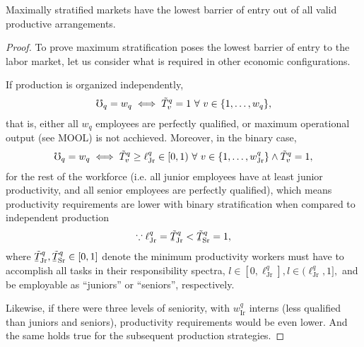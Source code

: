 \documentclass[hidelinks, nonatbib]{elsarticle}
\begin{document}
\begin{lemma}
    \label{mpl}
    Maximally stratified markets have the lowest barrier of entry out of all valid productive arrangements.
    
    \begin{proof}
        To prove maximum stratification poses the lowest barrier of entry to the labor market, let us consider what is required in other economic configurations.
        
        If production is organized independently,
        \begin{gather}
        \mho_q = w_q
        \iff
        \tilde{T}_{v}^{q}
        =
        1
        \
        \forall
        \
        v \in \{1, \dots, w_q\}
        ,
        \end{gather}
        that is, either all $w_q$ employees are perfectly qualified, or maximum operational output (see MOOL) is not acchieved. Moreover, in the binary case,
        \begin{gather}
        \mho_q = w_q
        \iff
        \tilde{T}_{v}^{q}
        \geq
        \ell_{\text{Jr}}^{q}
        \in
        [0,1)
        \
        \forall
        \
        v \in \{1, \dots, w_{\text{Jr}}^{q}\}
        \land
        \tilde{T}_{v}^{q}
        =
        1
        ,
        \end{gather}
        for the rest of the workforce (i.e. all junior employees have at least junior productivity, and all senior employees are perfectly qualified), which means productivity requirements are lower with binary stratification when compared to independent production
        \begin{gather}
            \because
            \ell_{\text{Jr}}^{q}
            =
            \underaccent{\bar}{\tilde{T}}_{\text{Jr}}^{q}
            <
            \underaccent{\bar}{\tilde{T}}_{\text{Sr}}^{q}
            = 1
            ,
        \end{gather}
        where $\underaccent{\bar}{\tilde{T}}_{\text{Jr}}^{q}, \underaccent{\bar}{\tilde{T}}_{\text{Sr}}^{q} \in [0,1]$ denote the minimum productivity workers must have to accomplish all tasks in their responsibility spectra,
        $
            l \in [0, \ell_{\text{Jr}}^{q}]
            ,
            l \in (\ell_{\text{Jr}}^{q}, 1]
            ,
        $
        and be employable as ``juniors'' or ``seniors'', respectively.

        Likewise, if there were three levels of seniority, with $w_{\text{Ir}}^{q}$ interns (less qualified than juniors and seniors), productivity requirements would be even lower. And the same holds true for the subsequent production strategies.
        

\end{proof}
\end{lemma}
\end{document}
